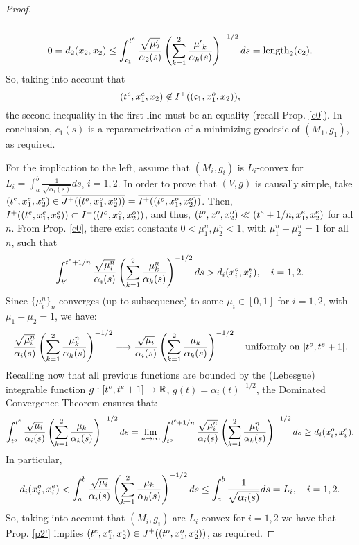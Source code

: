 \begin{proof}
\[\begin{array}{c}
\\ 0=d_{2}(x_{2},x_{2}) \leq \displaystyle\Integral{\C_1}{t^e}{\mu'_{2}}{2}{{\mu'}_{k}}=\hbox{length}_2(c_{2}).
%
%
\end{array}
\]
So, taking into account that $$(t^e,x^e_{1},x_{2}) \not\in I^+((\mathfrak{c}_1,x^o_{1},x_{2})),$$ the second inequality in the first line must be an equality (recall Prop. \ref{c0}). In conclusion, $c_1(s)$ is a reparametrization of a minimizing geodesic of $(M_1,g_1)$, as required.

\smallskip

For the implication to the left, assume that $(M_i,g_i)$ is $L_i$-convex for $L_i=\int_{a}^{b}\frac{1}{\sqrt{\alpha_i(s)}}ds$, $i=1,2$. In order to prove that $(V,g)$ is causally simple,
take $(t^{e},x_{1}^{e},x_{2}^{e}) \in \overline{J^{+}((t^{o},x_{1}^{o},x_{2}^{o}))}=\overline{I^{+}((t^{o},x_{1}^{o},x_{2}^{o}))}$. Then, $I^+((t^{e},x_{1}^{e},x_{2}^{e})) \subset I^+((t^{o},x_{1}^{o},x_{2}^{o}))$, and thus, $(t^{o},x_{1}^{o},x_{2}^{o}) \ll (t^{e}+1/n,x_{1}^{e},x_{2}^{e})$ for all $n$.
From Prop. \ref{c0}, there exist constants $0 <\mu_{1}^{n},\mu_{2}^{n} < 1$, with $\mu_{1}^{n}+\mu_{2}^{n}=1$ for all $n$, such that
\[
\int_{t^o}^{t^{e}+1/n} \frac{\sqrt{\mu_{i}^{n}}}{\alpha_{i}(s)}\left(\sum_{k=1}^{2} \frac{\mu_{k}^{n}}{\alpha_{k}(s)} \right)^{-1/2}ds
> d_{i}(x_{i}^{o},x_{i}^{e}),\quad i=1,2.
\]
Since $\{\mu_{i}^{n}\}_{n}$ converges (up to subsequence) to some $\mu_{i} \in [0,1]$ for $i=1,2$, with $\mu_{1}+\mu_{2}=1$, we have:
\[
\frac{\sqrt{\mu_{i}^{n}}}{\alpha_{i}(s)}\left(\sum_{k=1}^2 \frac{\mu_{k}^{n}}{\alpha_{k}(s)}\right)^{-1/2}\longrightarrow
\frac{\sqrt{\mu_{i}}}{\alpha_{i}(s)}\left(\sum_{k=1}^2 \frac{\mu_{k}}{\alpha_{k}(s)}\right)^{-1/2}\quad\hbox{uniformly on $[t^o,t^e+1]$.}
\]
Recalling now that all previous functions are bounded by the (Lebesgue) integrable function $g:[t^o,t^e+1]\rightarrow {\mathbb R}$,
    $g(t)=\alpha_i(t)^{-1/2}$, the Dominated Convergence Theorem ensures that:
\[
\int_{t^o}^{t^e} \frac{\sqrt{\mu_{i}}}{\alpha_{i}(s)}\left(\sum_{k=1}^{2} \frac{\mu_{k}}{\alpha_{k}(s)} \right)^{-1/2}ds
=\lim_{n\rightarrow\infty} \int_{t^{o}}^{t^{e}+1/n} \frac{\sqrt{\mu_{i}^{n}}}{\alpha_{i}(s)}\left(\sum_{k=1}^{2} \frac{\mu_{k}^n}{\alpha_{k}(s)} \right)^{-1/2}ds \geq d_{i}(x_{i}^{o},x_{i}^{e}).
\]
In particular,
\[
d_{i}(x_{i}^{o},x_{i}^{e})<\int_{a}^{b} \frac{\sqrt{\mu_{i}}}{\alpha_{i}(s)}\left(\sum_{k=1}^{2} \frac{\mu_{k}}{\alpha_{k}(s)} \right)^{-1/2}ds \le \int_{a}^{b}\frac{1}{\sqrt{\alpha_i(s)}}ds=L_i,\quad i=1,2.
\]
So, taking into account that $(M_i,g_i)$ are $L_i$-convex for $i=1,2$ we have that Prop. \ref{p2'} implies $(t^{e},x_{1}^{e},x_2^e) \in J^{+}((t^{o},x_{1}^{o},x_2^o))$, as required.
\end{proof}

